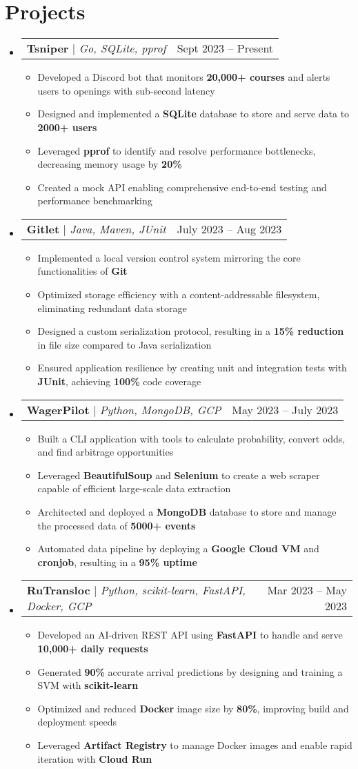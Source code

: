 \documentclass[letterpaper,11pt]{article}
\makeatletter
\newcommand{\resumeItem}[1]{
  \item\small{
    {#1 \vspace{-2pt}}
  }
}
\newcommand{\resumeProjectHeading}[2]{
    \item
    \begin{tabular*}{0.97\textwidth}{l@{\extracolsep{\fill}}r}
      \small#1 & #2 \\
    \end{tabular*}\vspace{-7pt}
}
\newcommand{\resumeSubHeadingListStart}{\begin{itemize}[leftmargin=0.15in, label={}]}
\newcommand{\resumeSubHeadingListEnd}{\end{itemize}}
\newcommand{\resumeItemListStart}{\begin{itemize}}
\newcommand{\resumeItemListEnd}{\end{itemize}\vspace{-3pt}}
\makeatother
\begin{document}
\section{Projects}
    \resumeSubHeadingListStart
      \resumeProjectHeading
          {\textbf{Tsniper} $|$ \emph{Go, SQLite, pprof}}{Sept 2023 -- Present}
          \resumeItemListStart
            \resumeItem{Developed a Discord bot that monitors \textbf{20,000+ courses} and alerts users to openings with sub-second latency}
            \resumeItem{Designed and implemented a \textbf{SQLite} database to store and serve data to \textbf{2000+ users}}
            \resumeItem{Leveraged \textbf{pprof} to identify and resolve performance bottlenecks, decreasing memory usage by \textbf{20\%}}
            \resumeItem{Created a mock API enabling comprehensive end-to-end testing and performance benchmarking}
          \resumeItemListEnd
      \resumeProjectHeading
          {\textbf{Gitlet} $|$ \emph{Java, Maven, JUnit}}{July 2023 -- Aug 2023}
      \resumeItemListStart  
            \resumeItem{Implemented a local version control system mirroring the core functionalities of \textbf{Git}}
            \resumeItem{Optimized storage efficiency with a content-addressable filesystem, eliminating redundant data storage}
            \resumeItem{Designed a custom serialization protocol, resulting in a \textbf{15\% reduction} in file size compared to Java serialization}
            \resumeItem{Ensured application resilience by creating unit and integration tests with \textbf{JUnit}, achieving \textbf{100\%} code coverage}
          \resumeItemListEnd
      \resumeProjectHeading
          {\textbf{WagerPilot} $|$ \emph{Python, MongoDB, GCP}}{May 2023 -- July 2023}
          \resumeItemListStart
            \resumeItem{Built a CLI application with tools to calculate probability, convert odds, and find arbitrage opportunities}
            \resumeItem{Leveraged \textbf{BeautifulSoup} and \textbf{Selenium} to create a web scraper capable of efficient large-scale data extraction}
            \resumeItem{Architected and deployed a \textbf{MongoDB} database to store and manage the processed data of \textbf{5000+ events}}
            \resumeItem{Automated data pipeline by deploying a \textbf{Google Cloud VM} and \textbf{cronjob}, resulting in a \textbf{95\% uptime}}
          \resumeItemListEnd
      \resumeProjectHeading
          {\textbf{RuTransloc} $|$ \emph{Python, scikit-learn, FastAPI, Docker, GCP}}{Mar 2023 -- May 2023}
          \resumeItemListStart
            \resumeItem{Developed an AI-driven REST API using \textbf{FastAPI} to handle and serve \textbf{10,000+ daily requests}}
            \resumeItem{Generated \textbf{90\%} accurate arrival predictions by designing and training a SVM with \textbf{scikit-learn}}
            \resumeItem{Optimized and reduced \textbf{Docker} image size by \textbf{80\%}, improving build and deployment speeds}
            \resumeItem{Leveraged \textbf{Artifact Registry} to manage Docker images and enable rapid iteration with \textbf{Cloud Run}}
          \resumeItemListEnd
    \resumeSubHeadingListEnd
\end{document}
